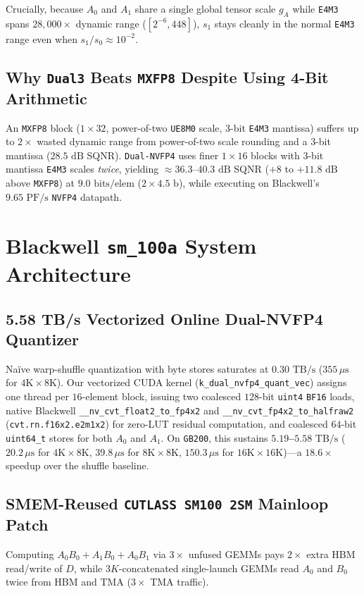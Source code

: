\documentclass[conference,10pt]{IEEEtran}
\begin{document}
Crucially, because $A_0$ and $A_1$ share a single global tensor scale $g_A$ while \texttt{E4M3} spans $28{,}000\times$ dynamic range ($[2^{-6}, 448]$), $s_1$ stays cleanly in the normal \texttt{E4M3} range even when $s_1 / s_0 \approx 10^{-2}$.

\subsection{Why \texttt{Dual3} Beats \texttt{MXFP8} Despite Using 4-Bit Arithmetic}
An \texttt{MXFP8} block ($1{\times}32$, power-of-two \texttt{UE8M0} scale, $3$-bit \texttt{E4M3} mantissa) suffers up to $2\times$ wasted dynamic range from power-of-two scale rounding and a $3$-bit mantissa ($28.5\text{ dB}$ SQNR). \texttt{Dual-NVFP4} uses finer $1{\times}16$ blocks with $3$-bit mantissa \texttt{E4M3} scales \emph{twice}, yielding $\approx 36.3$--$40.3\text{ dB}$ SQNR ($+8$ to $+11.8\text{ dB}$ above \texttt{MXFP8}) at $9.0\text{ bits/elem}$ ($2 \times 4.5\text{ b}$), while executing on Blackwell's $9.65\text{ PF/s}$ \texttt{NVFP4} datapath.

\section{Blackwell \texttt{sm\_100a} System Architecture}

\subsection{5.58 TB/s Vectorized Online Dual-NVFP4 Quantizer}
Na\"ive warp-shuffle quantization with byte stores saturates at $0.30\text{ TB/s}$ ($355\,\mu\text{s}$ for $4\text{K}{\times}8\text{K}$). Our vectorized CUDA kernel (\texttt{k\_dual\_nvfp4\_quant\_vec}) assigns one thread per $16$-element block, issuing two coalesced $128$-bit \texttt{uint4} \texttt{BF16} loads, native Blackwell \texttt{\_\_nv\_cvt\_float2\_to\_fp4x2} and \texttt{\_\_nv\_cvt\_fp4x2\_to\_halfraw2} (\texttt{cvt.rn.f16x2.e2m1x2}) for zero-LUT residual computation, and coalesced $64$-bit \texttt{uint64\_t} stores for both $A_0$ and $A_1$. On \texttt{GB200}, this sustains \textbf{$5.19$--$5.58\text{ TB/s}$} ($20.2\,\mu\text{s}$ for $4\text{K}{\times}8\text{K}$, $39.8\,\mu\text{s}$ for $8\text{K}{\times}8\text{K}$, $150.3\,\mu\text{s}$ for $16\text{K}{\times}16\text{K}$)---a $18.6\times$ speedup over the shuffle baseline.

\subsection{SMEM-Reused \texttt{CUTLASS SM100 2SM} Mainloop Patch}
Computing $A_0 B_0 + A_1 B_0 + A_0 B_1$ via $3\times$ unfused GEMMs pays $2\times$ extra HBM read/write of $D$, while $3K$-concatenated single-launch GEMMs read $A_0$ and $B_0$ twice from HBM and TMA ($3\times$ TMA traffic).
\end{document}
